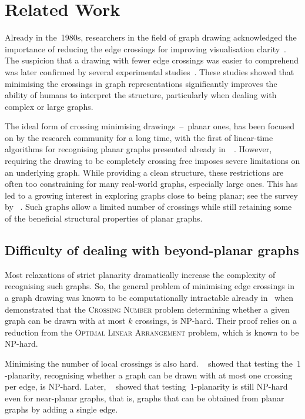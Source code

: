 \chapter{Related Work}\label{ch:related-work}

Already in the~1980s, researchers in the field of graph drawing acknowledged the importance of reducing the edge crossings for improving visualisation clarity~\cite{early-few-crossing}. The suspicion that a drawing with fewer edge crossings was easier to comprehend was later confirmed by several experimental studies~\cite{graph-aesthetic-survey}. These studies showed that minimising the crossings in graph representations significantly improves the ability of humans to interpret the structure, particularly when dealing with complex or large graphs.

The ideal form of crossing minimising drawings~--~planar ones, has been focused on by the research community for a long time, with the first of linear-time algorithms for recognising planar graphs presented already in~\citeyear{linear-p}~\cite{linear-p}. However, requiring the drawing to be completely crossing free imposes severe limitations on an underlying graph. While providing a clean structure, these restrictions are often too constraining for many real-world graphs, especially large ones. This has led to a growing interest in exploring graphs close to being planar; see the survey by \citeauthor{beyond-planarity-survey}~\cite{beyond-planarity-survey}. Such graphs allow a limited number of crossings while still retaining some of the beneficial structural properties of planar graphs.


\section{Difficulty of dealing with beyond-planar graphs}

Most relaxations of strict planarity dramatically increase the complexity of recognising such graphs. So, the general problem of minimising edge crossings in a graph drawing was known to be computationally intractable already in~\citeyear{cr_NPC} when \citeauthor{cr_NPC}~\cite{cr_NPC} demonstrated that the \textsc{Crossing Number} problem determining whether a given graph can be drawn with at most \(k\) crossings, is NP-hard. Their proof relies on a reduction from the \textsc{Optimal Linear Arrangement} problem, which is known to be NP-hard.

Minimising the number of local crossings is also hard. \citeauthor{1p-NPH}~\cite{1p-NPH} showed that testing the~\(1\)-planarity, recognising whether a graph can be drawn with at most one crossing per edge, is NP-hard. Later, \citeauthor{one-edge-NPH}~\cite{one-edge-NPH} showed that testing~\(1\)-planarity is still NP-hard even for near-planar graphs, that is, graphs that can be obtained from planar graphs by adding a single edge.

